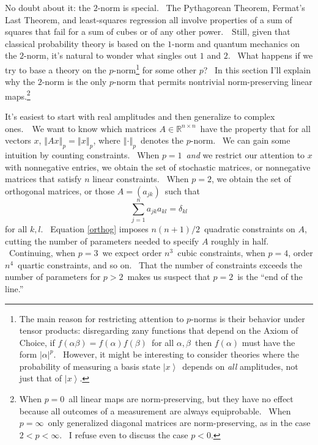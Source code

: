 \documentclass[12pt]{article}%
\begin{document}
No doubt about it: the $2$-norm is special. \ The Pythagorean Theorem,
Fermat's Last Theorem, and least-squares regression all involve properties of
a sum of squares that fail for a sum of cubes or of any other power.\ \ Still,
given that classical probability theory is based on the $1$-norm and quantum
mechanics on the $2$-norm, it's natural to wonder what singles out $1$ and
$2$. \ What happens if we try to base a theory on the $p$-norm\footnote{The
main reason for restricting attention to $p$-norms is their behavior under
tensor products: disregarding zany functions that depend on the Axiom of
Choice, if $f\left(  \alpha\beta\right)  =f\left(  \alpha\right)  f\left(
\beta\right)  $\ for all $\alpha,\beta$\ then $f\left(  \alpha\right)  $ must
have the form $\left\vert \alpha\right\vert ^{p}$. \ However, it might be
interesting to consider theories where the probability of measuring a basis
state $\left\vert x\right\rangle $\ depends on \textit{all} amplitudes, not
just that of $\left\vert x\right\rangle $.} for some other $p$? \ In this
section I'll explain why the $2$-norm is the only $p$-norm that permits
nontrivial norm-preserving linear maps.\footnote{When $p=0$\ all linear maps
are norm-preserving, but they have no effect because all outcomes of a
measurement are always equiprobable. \ When $p=\infty$\ only generalized
diagonal matrices are norm-preserving, as in the case $2<p<\infty$. \ I refuse
even to discuss the case $p<0$.}

It's easiest to start with real amplitudes and then generalize to complex
ones.\ \ We want to know which matrices $A\in\mathbb{R}^{n\times n}$\ have the
property that for all vectors $x$, $\left\Vert Ax\right\Vert _{p}=\left\Vert
x\right\Vert _{p}$, where $\left\Vert \cdot\right\Vert _{p}$\ denotes the
$p$-norm. \ We can gain some intuition by counting constraints. \ When
$p=1$\ \textit{and} we restrict our attention to $x$ with nonnegative entries,
we obtain the set of stochastic matrices, or nonnegative matrices that satisfy
$n$ linear constraints. \ When $p=2$, we obtain the set of orthogonal
matrices, or those $A=\left(  a_{jk}\right)  $\ such that%
\begin{equation}
\sum_{j=1}^{n}a_{jk}a_{kl}=\delta_{kl} \label{orthog}%
\end{equation}
for all $k,l$. \ Equation \ref{orthog} imposes $n\left(  n+1\right)
/2$\ quadratic constraints on $A$, cutting the number of parameters needed to
specify $A$ roughly in half. \ Continuing, when $p=3$\ we expect order $n^{3}%
$\ cubic constraints, when $p=4$, order $n^{4}$\ quartic constraints, and so
on. \ That the number of constraints exceeds the number of parameters for
$p>2$\ makes us suspect that $p=2$\ is the \textquotedblleft end of the line.\textquotedblright
\end{document}
